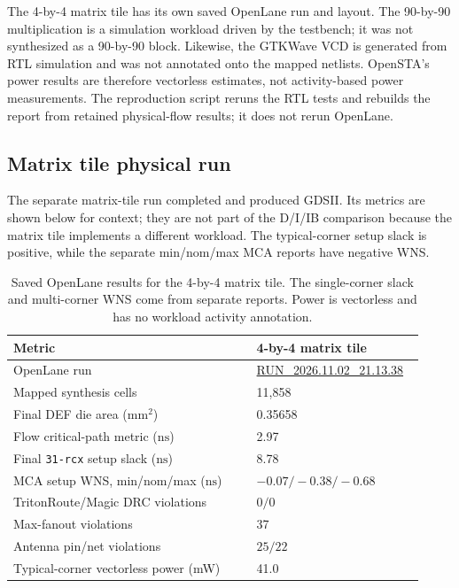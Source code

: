 \documentclass[10pt,a4paper]{article}
\begin{document}
The 4-by-4 matrix tile has its own saved OpenLane run and layout. The
90-by-90 multiplication is a simulation workload driven by the testbench;
it was not synthesized as a 90-by-90 block. Likewise, the GTKWave VCD is
generated from RTL simulation and was not annotated onto the mapped
netlists. OpenSTA's power results are therefore vectorless estimates, not
activity-based power measurements. The reproduction script reruns the RTL
tests and rebuilds the report from retained physical-flow results; it does
not rerun OpenLane.

\subsection{Matrix tile physical run}

The separate matrix-tile run completed and produced GDSII. Its metrics are
shown below for context; they are not part of the D/I/IB comparison because
the matrix tile implements a different workload. The typical-corner setup
slack is positive, while the separate min/nom/max MCA reports have negative
WNS.

\begin{table}[!htbp]
\centering
\small
\begin{tabular}{p{0.56\linewidth}p{0.36\linewidth}}
\toprule
Metric & 4-by-4 matrix tile\\
\midrule
OpenLane run & \url{RUN_2026.11.02_21.13.38}\\
Mapped synthesis cells & 11,858\\
Final DEF die area (\(\mathrm{mm}^2\)) & 0.35658\\
Flow critical-path metric (\(\mathrm{ns}\)) & 2.97\\
Final \texttt{31-rcx} setup slack (\(\mathrm{ns}\)) & 8.78\\
MCA setup WNS, min/nom/max (\(\mathrm{ns}\)) & \(-0.07/-0.38/-0.68\)\\
TritonRoute/Magic DRC violations & \(0/0\)\\
Max-fanout violations & 37\\
Antenna pin/net violations & \(25/22\)\\
Typical-corner vectorless power (mW) & 41.0\\
\bottomrule
\end{tabular}
\caption{Saved OpenLane results for the 4-by-4 matrix tile. The
single-corner slack and multi-corner WNS come from separate reports. Power
is vectorless and has no workload activity annotation.}
\label{tab:matrix-physical}
\end{table}
\end{document}
